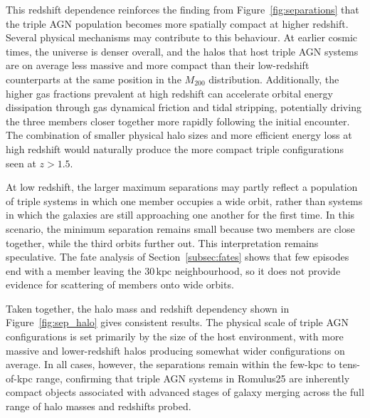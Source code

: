 \documentclass[twocolumn, 10pt]{article}
\begin{document}
This redshift dependence reinforces the finding from Figure~\ref{fig:separations} that the triple AGN population becomes more spatially compact at higher redshift. Several physical mechanisms may contribute to this behaviour. At earlier cosmic times, the universe is denser overall, and the halos that host triple AGN systems are on average less massive and more compact than their low-redshift counterparts at the same position in the $M_{200}$ distribution. Additionally, the higher gas fractions prevalent at high redshift can accelerate orbital energy dissipation through gas dynamical friction and tidal stripping, potentially driving the three members closer together more rapidly following the initial encounter. The combination of smaller physical halo sizes and more efficient energy loss at high redshift would naturally produce the more compact triple configurations seen at $z > 1.5$.
 
At low redshift, the larger maximum separations may partly reflect a population of triple systems in which one member occupies a wide orbit, rather than systems in which the galaxies are still approaching one another for the first time. In this scenario, the minimum separation remains small because two members are close together, while the third orbits further out. This interpretation remains speculative. The fate analysis of Section~\ref{subsec:fates} shows that few episodes end with a member leaving the $30\,\mathrm{kpc}$ neighbourhood, so it does not provide evidence for scattering of members onto wide orbits.
 
Taken together, the halo mass and redshift dependency shown in Figure~\ref{fig:sep_halo} gives consistent results. The physical scale of triple AGN configurations is set primarily by the size of the host environment, with more massive and lower-redshift halos producing somewhat wider configurations on average. In all cases, however, the separations remain within the few-kpc to tens-of-kpc range, confirming that triple AGN systems in Romulus25 are inherently compact objects associated with advanced stages of galaxy merging across the full range of halo masses and redshifts probed.
 
\end{document}

